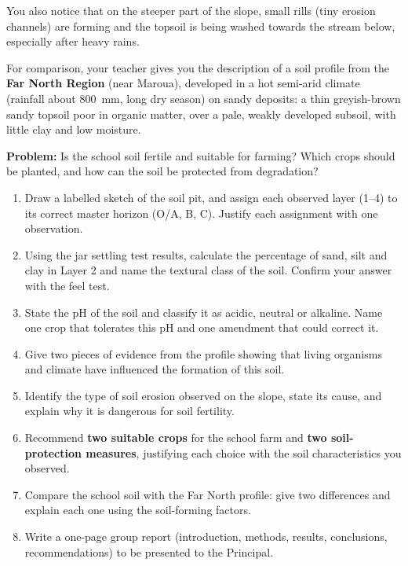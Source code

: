 \documentclass[11pt]{article}
\newcommand{\cle}[1]{{\popxbold\color{popdark}#1}}
\newcounter{popsec}
\newcounter{popsub}
\newcommand{\courssub}[1]{%
  \stepcounter{popsub}%
  \par\vspace{9pt}\noindent{\popxbold\fontsize{11.5}{13}\selectfont\color{popink}{\color{poporange}\thepopsec.\thepopsub}\hspace{6pt}#1}\par\nopagebreak\vspace{4pt}
}
\begin{document}
You also notice that on the steeper part of the slope, small \cle{rills} (tiny erosion channels) are forming and the topsoil is being washed towards the stream below, especially after heavy rains.

For comparison, your teacher gives you the description of a soil profile from the \textbf{Far North Region} (near Maroua), developed in a hot semi-arid climate (rainfall about \SI{800}{mm}, long dry season) on sandy deposits: a thin greyish-brown sandy topsoil poor in organic matter, over a pale, weakly developed subsoil, with little clay and low moisture.

\textbf{Problem:} Is the school soil fertile and suitable for farming? Which crops should be planted, and how can the soil be protected from degradation?

\courssub{Tasks}

\begin{enumerate}
\item Draw a labelled sketch of the soil pit, and assign each observed layer (1--4) to its correct master horizon (O/A, B, C). Justify each assignment with one observation.
\item Using the jar settling test results, calculate the percentage of sand, silt and clay in Layer 2 and name the \cle{textural class} of the soil. Confirm your answer with the feel test.
\item State the pH of the soil and classify it as acidic, neutral or alkaline. Name one crop that tolerates this pH and one amendment that could correct it.
\item Give two pieces of evidence from the profile showing that \cle{living organisms} and \cle{climate} have influenced the formation of this soil.
\item Identify the type of \cle{soil erosion} observed on the slope, state its cause, and explain why it is dangerous for soil fertility.
\item Recommend \textbf{two suitable crops} for the school farm and \textbf{two soil-protection measures}, justifying each choice with the soil characteristics you observed.
\item Compare the school soil with the Far North profile: give two differences and explain each one using the \cle{soil-forming factors}.
\item Write a one-page group report (introduction, methods, results, conclusions, recommendations) to be presented to the Principal.
\end{enumerate}
\end{document}
